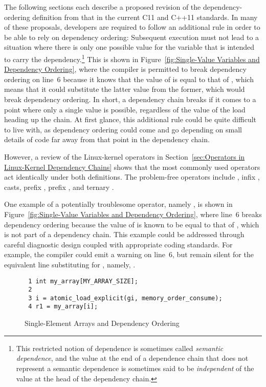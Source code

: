 \documentclass[letterpaper,twocolumn,10pt]{article}
\begin{document}
The following sections each describe a proposed revision of
the dependency-ordering definition from that in the current
C11 and C++11 standards.
In many of these proposals, developers are required to follow an
additional rule in
order to be able to rely on dependency ordering:
Subsequent execution must not lead to a situation where there is only
one possible value for the variable that is intended to carry the
dependency.\footnote{
	This restricted notion of dependence is sometimes called
	\emph{semantic dependence}, and the value at the end of
	a dependence chain that does not represent a semantic
	dependence is sometimes said to be \emph{independent}
	of the value at the head of the dependency chain.}
This is shown in
Figure~\ref{fig:Single-Value Variables and Dependency Ordering},
where the compiler is permitted to break dependency ordering on
line~6 because it knows that the value of  is equal to that
of , which means that it could substitute the latter value
from the former, which would break dependency ordering.
In short, a dependency chain breaks if it comes to a point where only
a single value is possible, regardless of the value of the
 load heading up the chain.
At first glance, this additional rule could be quite difficult to live with,
as dependency ordering could come and go depending on small details of
code far away from that point in the dependency chain.

However, a review of the Linux-kernel operators in
Section~\ref{sec:Operators in Linux-Kernel Dependency Chains}
shows that the most commonly used operators act identically under
both definitions.
The problem-free operators include
\co{->}, infix \co{=}, casts, prefix \co{&}, prefix \co{*}, and
ternary .

One example of a potentially troublesome operator, namely \co{==}, is shown in
Figure~\ref{fig:Single-Value Variables and Dependency Ordering},
where line~6 breaks dependency ordering because the value of
 is known to be equal to that of , which is not part
of a dependency chain.
This example could be addressed through careful diagnostic design
coupled with appropriate coding standards.
For example, the compiler could emit a warning on line~6, but remain
silent for the equivalent line substituting  for ,
namely, .

\begin{figure}[tbp]
{ \scriptsize
\begin{verbatim}
 1 int my_array[MY_ARRAY_SIZE];
 2 
 3 i = atomic_load_explicit(gi, memory_order_consume);
 4 r1 = my_array[i];
\end{verbatim}
}
\caption{Single-Element Arrays and Dependency Ordering}
\label{fig:Single-Element Arrays and Dependency Ordering}
\end{figure}
\end{document}
